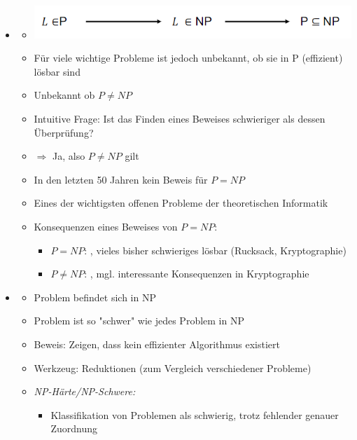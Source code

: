 \documentclass[
    12pt,
    a4paper,
    ngerman,
    color=3b,%
    marginpar=false,
    colorback=false,
    leqno,
]{tudaexercise}
\begin{document}
\begin{itemize}
    \item {}
          \begin{itemize}
              \item[] \includegraphics[width=12cm]{pictures/pnp.PNG}
              \item Für viele wichtige Probleme ist jedoch unbekannt, ob sie in P (effizient) lösbar sind
              \item Unbekannt ob $P \neq NP$
              \item Intuitive Frage: Ist das Finden eines Beweises schwieriger als dessen Überprüfung?
              \item[] $\Rightarrow$ Ja, also $P \neq NP$ gilt
              \item In den letzten 50 Jahren kein Beweis für $P = NP$
              \item Eines der wichtigsten offenen Probleme der theoretischen Informatik
              \item Konsequenzen eines Beweises von $P=NP$:
                    \begin{itemize}
                        \item $P=NP$: , vieles bisher schwieriges lösbar (Rucksack, Kryptographie)
                        \item $P\neq NP$: , mgl. interessante Konsequenzen in Kryptographie
                    \end{itemize}
          \end{itemize}
          \clearpage
    \item {}
          \begin{itemize}
              \item Problem befindet sich in NP
              \item Problem ist so \string"schwer\string" wie jedes Problem in NP
              \item Beweis: Zeigen, dass kein effizienter Algorithmus existiert
              \item Werkzeug: Reduktionen (zum Vergleich verschiedener Probleme)
              \item \textit{NP-Härte/NP-Schwere:}
                    \begin{itemize}
                        \item Klassifikation von Problemen als schwierig, trotz fehlender genauer Zuordnung

\end{itemize}
\end{itemize}
\end{itemize}
\end{document}
